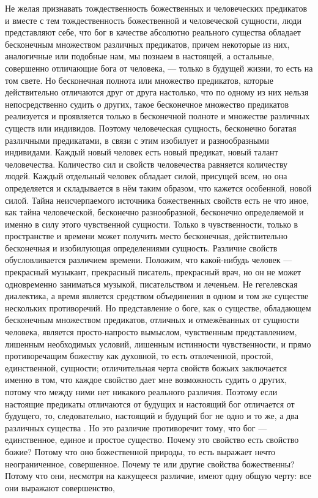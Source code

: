 \documentclass[12pt,oneside]{book}
\begin{document}
Не желая признавать тождественность божественных и человеческих предикатов и вместе с тем тождественность божественной и человеческой сущности, люди представляют себе, что бог в качестве абсолютно реального существа обладает бесконечным множеством различных предикатов, причем некоторые из них, аналогичные или подобные нам, мы познаем в настоящей, а остальные, совершенно отличающие бога от человека, --- только в будущей жизни, то есть на том свете. Но бесконечная полнота или множество предикатов, которые действительно отличаются друг от друга настолько, что по одному из них нельзя непосредственно судить о других, такое бесконечное множество предикатов реализуется и проявляется только в бесконечной полноте и множестве различных существ или индивидов. Поэтому человеческая сущность, бесконечно богатая различными предикатами, в связи с этим изобилует и разнообразными индивидами. Каждый новый человек есть новый предикат, новый талант человечества. Количество сил и свойств человечества равняется количеству людей. Каждый отдельный человек обладает силой, присущей всем, но она определяется и складывается в нём таким образом, что кажется особенной, новой силой. Тайна неисчерпаемого источника божественных свойств есть не что иное, как тайна человеческой, бесконечно разнообразной, бесконечно определяемой и именно в силу этого чувственной сущности. Только в чувственности, только в пространстве и времени может получить место бесконечная, действительно бесконечная и изобилующая определениями сущность. Различие свойств обусловливается различием времени. Положим, что какой-нибудь человек --- прекрасный музыкант, прекрасный писатель, прекрасный врач, но он не может одновременно заниматься музыкой, писательством и леченьем. Не гегелевская диалектика, а время является средством объединения в одном и том же существе нескольких противоречий. Но представление о боге, как о существе, обладающем бесконечным множеством предикатов, отличных и отмежёванных от сущности человека, является просто-напросто вымыслом, чувственным представлением, лишенным необходимых условий, лишенным истинности чувственности, и прямо противоречащим божеству как духовной, то есть отвлеченной, простой, единственной, сущности; отличительная черта свойств божьих заключается именно в том, что каждое свойство дает мне возможность судить о других, потому что между ними нет никакого реального различия. Поэтому если настоящие предикаты отличаются от будущих и настоящий бог отличается от будущего, то, следовательно, настоящий и будущий бог не одно и то же, а два различных существа \dag\let\svthefootnote\thefootnote\let\thefootnote\relax{}\let\thefootnote\svthefootnote. Но это различие противоречит тому, что бог --- единственное, единое и простое существо. Почему это свойство есть свойство божие? Потому что оно божественной природы, то есть выражает нечто неограниченное, совершенное. Почему те или другие свойства божественны? Потому что они, несмотря на кажущееся различие, имеют одну общую черту: все они выражают совершенство, 
\end{document}
